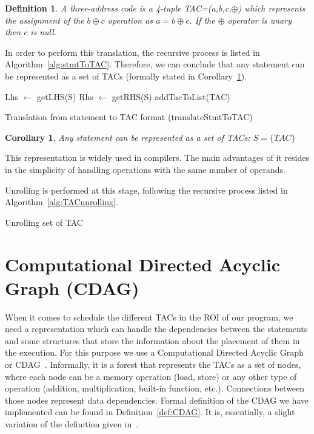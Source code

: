 \documentclass[a4paper,12pt]{memoir}
\newtheorem{definition}{Definition}[]
\newtheorem{corollary}{Corollary}[]
\begin{document}
\theoremstyle{definition}
\begin{definition}\label{def:TAC}
	A three-address code is a 4-tuple TAC=(a,b,c,$\oplus$) which represents the 
	assignment of the $b \oplus c$ operation as $a
	= 
	b \oplus c$. If the $\oplus$ operator is unary then $c$ is null.
\end{definition}

In order to perform this translation, the recursive process is listed in 
Algorithm~\ref{alg:stmtToTAC}. Therefore, we can conclude that any statement 
can be represented as a set of TACs (formally stated in 
Corollary~\ref{cor:TAC}).

\begin{algorithm}[H]\label{alg:stmtToTAC}
	\SetAlgoLined
	Lhs $\leftarrow$ getLHS(S)\;
	Rhs $\leftarrow$ getRHS(S)\;
	addTacToList(TAC)\;
	\caption{Translation from statement to TAC format (translateStmtToTAC)}
\end{algorithm}

\begin{corollary}\label{cor:TAC}
	Any statement can be represented as a set of TACs:
	$S = \{TAC\}$
\end{corollary}

This representation is widely used in compilers. The main advantages of it 
resides in the simplicity of handling operations with the same number of 
operands. 

Unrolling is performed at this stage, following the recursive process listed in 
Algorithm~\ref{alg:TACunrolling}.

\begin{algorithm}[H]\label{alg:TACunrolling}
	\SetAlgoLined
	\caption{Unrolling set of TAC}
\end{algorithm}


\section{Computational Directed Acyclic Graph (CDAG)}
When it comes to schedule the different TACs in the ROI of our program, we need
a representation which can handle the dependencies between the statements and
some structures that store the information about the placement of them in the
execution. For this purpose we use a Computational Directed Acyclic Graph or 
CDAG~\cite{bib:CDAGdefinition}. Informally, it is a forest that represents the 
TACs as a set of nodes, where 
each node can be a memory operation (load, store) or any other type of 
operation (addition, multiplication, built-in function, etc.). Connections 
between those nodes represent data dependencies. Formal 
definition of the CDAG we have implemented can be found in 
Definition~\ref{def:CDAG}. It is, essentially, a slight variation 
of the definition given in~\cite{bib:CDAGdefinition}.
\end{document}
